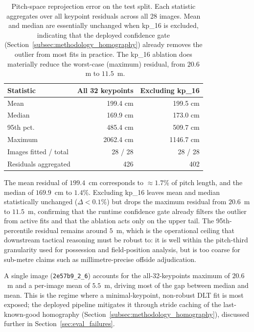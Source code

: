 \begin{table}[h]
\centering
\small
\begin{tabular}{lrr}
\toprule
Statistic & All 32 keypoints & Excluding kp\_16 \\
\midrule
Mean         & 199.4 cm & 199.5 cm \\
Median       & 169.9 cm & 173.0 cm \\
95th pct.    & 485.4 cm & 509.7 cm \\
Maximum      & 2062.4 cm & 1146.7 cm \\
\midrule
Images fitted / total & 28 / 28 & 28 / 28 \\
Residuals aggregated  & 426     & 402     \\
\bottomrule
\end{tabular}
\caption[Pitch-space reprojection error in centimetres, with and
without kp\_16 ablation.]{Pitch-space reprojection error on the test
split. Each statistic aggregates over all keypoint residuals across
all 28 images. Mean and median are essentially unchanged when kp\_16
is excluded, indicating that the deployed confidence gate
(Section~\ref{subsec:methodology_homography}) already removes the
outlier from most fits in practice. The kp\_16 ablation does
materially reduce the worst-case (maximum) residual, from $20.6$~m
to $11.5$~m.}
\label{tab:reprojection_error}
\end{table}

The mean residual of $199.4$~cm corresponds to $\approx 1.7\%$ of
pitch length, and the median of $169.9$~cm to $1.4\%$. Excluding
kp\_16 leaves mean and median statistically unchanged
($\Delta < 0.1\%$) but drops the maximum residual from $20.6$~m to $11.5$~m,
confirming that the runtime confidence gate already filters the
outlier from active fits and that the ablation acts only on the upper
tail. The 95th-percentile residual
remains around $5$~m, which is the operational ceiling that
downstream tactical reasoning must be robust to: it is well within
the pitch-third granularity used for possession and field-position
analysis, but is too coarse for sub-metre claims such as
millimetre-precise offside adjudication.

A single image (\texttt{2e57b9\_2\_6}) accounts for the
all-32-keypoints maximum of $20.6$~m and a per-image mean of
$5.5$~m, driving most of the gap between median and mean. This is
the regime where a minimal-keypoint, non-robust DLT fit is most
exposed; the deployed pipeline mitigates it through stride caching of
the last-known-good homography
(Section~\ref{subsec:methodology_homography}), discussed further in
Section~\ref{sec:eval_failures}.

